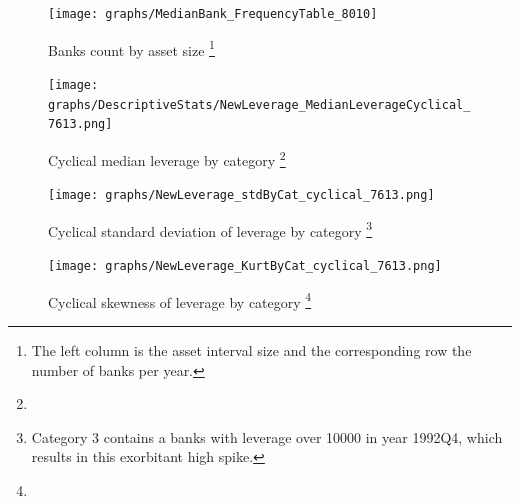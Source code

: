 \documentclass[12pt, a4paper]{article} %
\begin{document}
\begin{figure}[hbtp]
\begin{minipage}{\textwidth}
\centering
\caption[1]{Banks count by asset size \footnote{The left column is the asset interval size and the corresponding row the number of banks per year.}}
\texttt{[image: graphs/MedianBank\_FrequencyTable\_8010]}
\end{minipage}
\end{figure}

\begin{figure}[H]
\begin{minipage}{\textwidth}
\centering
\caption[1]{Cyclical median leverage by category \footnote{}}
\texttt{[image: graphs/DescriptiveStats/NewLeverage\_MedianLeverageCyclical\_7613.png]}
\label{fig:medianLeverage_cyclical_Categories}
\end{minipage}
\end{figure}

\begin{figure}[hbtp]
\begin{minipage}{\textwidth}
\centering
\caption[1]{Cyclical standard deviation of leverage by category \footnote{Category 3 contains a banks with leverage over 10000 in year 1992Q4, which results in this exorbitant high spike.}}
\texttt{[image: graphs/NewLeverage\_stdByCat\_cyclical\_7613.png]}
\label{fig:averageLeverage_cyclicalStd_Categories}
\end{minipage}
\end{figure}



\begin{figure}[hbtp]
\begin{minipage}{\textwidth}
\centering
\caption[1]{Cyclical skewness of leverage by category \footnote{}}
\texttt{[image: graphs/NewLeverage\_KurtByCat\_cyclical\_7613.png]}
\label{fig:averageLeverage_kurt_cyclical_Categories}
\end{minipage}
\end{figure}
\end{document}
